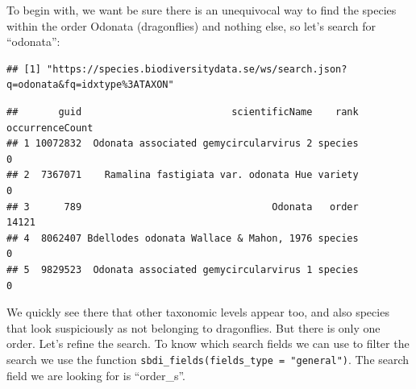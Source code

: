 \documentclass[
  10pt,
]{article}
\newenvironment{Shaded}{\begin{snugshade}}{\end{snugshade}}
\newcommand{\AttributeTok}[1]{\textcolor[rgb]{0.77,0.63,0.00}{#1}}
\newcommand{\DecValTok}[1]{\textcolor[rgb]{0.00,0.00,0.81}{#1}}
\newcommand{\FunctionTok}[1]{\textcolor[rgb]{0.00,0.00,0.00}{#1}}
\newcommand{\NormalTok}[1]{#1}
\newcommand{\OtherTok}[1]{\textcolor[rgb]{0.56,0.35,0.01}{#1}}
\newcommand{\SpecialCharTok}[1]{\textcolor[rgb]{0.00,0.00,0.00}{#1}}
\newcommand{\StringTok}[1]{\textcolor[rgb]{0.31,0.60,0.02}{#1}}
\begin{document}
To begin with, we want be sure there is an unequivocal way to find the
species within the order Odonata (dragonflies) and nothing else, so
let's search for ``odonata'':

\begin{Shaded}
\end{Shaded}

\begin{verbatim}
## [1] "https://species.biodiversitydata.se/ws/search.json?q=odonata&fq=idxtype%3ATAXON"
\end{verbatim}

\begin{verbatim}
##       guid                          scientificName    rank occurrenceCount
## 1 10072832  Odonata associated gemycircularvirus 2 species               0
## 2  7367071    Ramalina fastigiata var. odonata Hue variety               0
## 3      789                                 Odonata   order           14121
## 4  8062407 Bdellodes odonata Wallace & Mahon, 1976 species               0
## 5  9829523  Odonata associated gemycircularvirus 1 species               0
\end{verbatim}

We quickly see there that other taxonomic levels appear too, and also
species that look suspiciously as not belonging to dragonflies. But
there is only one order. Let's refine the search. To know which search
fields we can use to filter the search we use the function
\texttt{sbdi\_fields(fields\_type\ =\ "general")}. The search field we are looking
for is ``order\_s''.

\begin{Shaded}
\end{Shaded}
\end{document}
